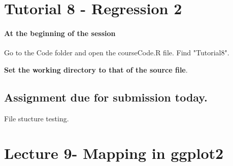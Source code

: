 \documentclass[titlepage]{book}\usepackage{knitr}
\begin{document}
\chapter{Tutorial 8 - Regression 2 }

\author{Brian Williams $<$\href{mailto:bjw649@gmail.com}%
{bjw649@gmail.com}$>$}

\subsubsection{At the beginning of the session}

Go to the Code folder and open the courseCode.R file.  Find "Tutorial8".

\textbf{Set the working directory to that of the source file}.


\begin{knitrout}
\color{fgcolor}\begin{kframe}
\begin{alltt}
\hlstd{(}\hlstd{)}
\end{alltt}
\end{kframe}
\end{knitrout}
    
\section{Assignment due for submission today.}  
File stucture testing.













\chapter{Lecture 9- Mapping in ggplot2}\label{Lecture9}

\author{Brian Williams $<$\href{mailto:bjw649@gmail.com}%
{bjw649@gmail.com}$>$}
\end{document}

